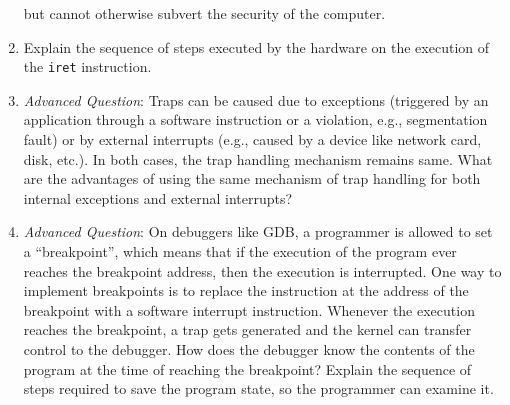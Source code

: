 \begin{enumerate}
but cannot otherwise subvert the security of the computer.
\item Explain the sequence of steps executed by the hardware on the execution of the {\tt iret}
instruction.
\item {\em Advanced Question}:
Traps can be caused due to exceptions (triggered by an application through a software
instruction or a violation, e.g., segmentation fault) or by external interrupts (e.g.,
caused by a device like network card, disk, etc.). In both cases, the trap handling mechanism
remains same. What are the advantages of using the same mechanism of trap handling for
both internal exceptions and external interrupts?
\item {\em Advanced Question}: On debuggers like GDB, a programmer is allowed to set a
``breakpoint'', which means that if the execution of the program ever reaches the breakpoint
address, then the execution is interrupted. One way to implement breakpoints is to
replace the instruction at the address of the breakpoint with a software interrupt
instruction. Whenever the execution reaches the breakpoint, a trap gets generated
and the kernel can transfer control to the debugger. How does the debugger know the
contents of the program at the time of reaching the breakpoint? Explain the sequence of
steps required to save the program state, so the programmer can examine it.
\end{enumerate}

